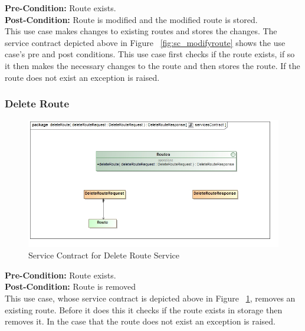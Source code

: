 \documentclass[a4paper,12pt]{article}
\begin{document}
\textbf{Pre-Condition: }
Route exists.\\
\textbf{Post-Condition: }
Route is modified and the modified route is stored.\\

This use case makes changes to existing routes and stores the changes. The service contract depicted above in Figure ~\ref{fig:sc_modifyroute} shows the use case's pre and post conditions. This use case first checks if the route exists, if so it then makes the necessary changes to the route and then stores the route. If the route does not exist an exception is raised. 
\subsubsection{Delete Route}

\begin{figure}[here]
\includegraphics[width=\textwidth]{images/scDelete_Route.jpg}
\caption{Service Contract for Delete Route Service}
\label{fig:sc_deleteroute}
\end{figure}

\textbf{Pre-Condition: }
Route exists.\\
\textbf{Post-Condition: }
Route is removed\\
This use case, whose service contract is depicted above in Figure ~\ref{fig:sc_deleteroute}, removes an existing route. Before it does this it checks if the route exists in storage then removes it. In the case that the route does not exist an exception is raised.
\end{document}
